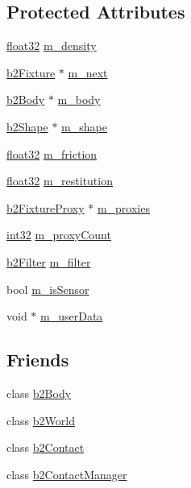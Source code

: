 \subsection*{Protected Attributes}
\begin{DoxyCompactItemize}
\item 
\mbox{\hyperlink{b2_settings_8h_aacdc525d6f7bddb3ae95d5c311bd06a1}{float32}} \mbox{\hyperlink{classb2_fixture_ab8c388182fc7d58d930f6b0aa21d5c60}{m\+\_\+density}}
\item 
\mbox{\hyperlink{classb2_fixture}{b2\+Fixture}} $\ast$ \mbox{\hyperlink{classb2_fixture_ac5c9fbdf66290e2608db1ffcea2316b0}{m\+\_\+next}}
\item 
\mbox{\hyperlink{classb2_body}{b2\+Body}} $\ast$ \mbox{\hyperlink{classb2_fixture_a480026124a6b7e88f2ed89832a08d191}{m\+\_\+body}}
\item 
\mbox{\hyperlink{classb2_shape}{b2\+Shape}} $\ast$ \mbox{\hyperlink{classb2_fixture_a54fa48dfc8b70a435c8f17f8b7720828}{m\+\_\+shape}}
\item 
\mbox{\hyperlink{b2_settings_8h_aacdc525d6f7bddb3ae95d5c311bd06a1}{float32}} \mbox{\hyperlink{classb2_fixture_a314118ee973ebd14e083553fed1e0212}{m\+\_\+friction}}
\item 
\mbox{\hyperlink{b2_settings_8h_aacdc525d6f7bddb3ae95d5c311bd06a1}{float32}} \mbox{\hyperlink{classb2_fixture_a343a35683ce4a79d2151761611027d66}{m\+\_\+restitution}}
\item 
\mbox{\hyperlink{structb2_fixture_proxy}{b2\+Fixture\+Proxy}} $\ast$ \mbox{\hyperlink{classb2_fixture_a0056031e2b2b53e6a4c0ef7a0c87821a}{m\+\_\+proxies}}
\item 
\mbox{\hyperlink{b2_settings_8h_a43d43196463bde49cb067f5c20ab8481}{int32}} \mbox{\hyperlink{classb2_fixture_aae71b4a0071346aba2eb6f4a764785a4}{m\+\_\+proxy\+Count}}
\item 
\mbox{\hyperlink{structb2_filter}{b2\+Filter}} \mbox{\hyperlink{classb2_fixture_a33b66959856506a6d27b32dad0e284c7}{m\+\_\+filter}}
\item 
bool \mbox{\hyperlink{classb2_fixture_a4b6b47a8de6d37acf9b980b33b22f634}{m\+\_\+is\+Sensor}}
\item 
void $\ast$ \mbox{\hyperlink{classb2_fixture_a60191e5c76bfd115e6c38d78b6cffd8b}{m\+\_\+user\+Data}}
\end{DoxyCompactItemize}
\subsection*{Friends}
\begin{DoxyCompactItemize}
\item 
class \mbox{\hyperlink{classb2_fixture_a010ab52de250e5fe30a45d642f46405b}{b2\+Body}}
\item 
class \mbox{\hyperlink{classb2_fixture_a4bd536c5a7c0587913765bbc2693ceea}{b2\+World}}
\item 
class \mbox{\hyperlink{classb2_fixture_a6c4ac5df27ec498dd9e4281352b7a789}{b2\+Contact}}
\item 
class \mbox{\hyperlink{classb2_fixture_aece264d42f69aed410f5eb3beba6ddf2}{b2\+Contact\+Manager}}
\end{DoxyCompactItemize}


